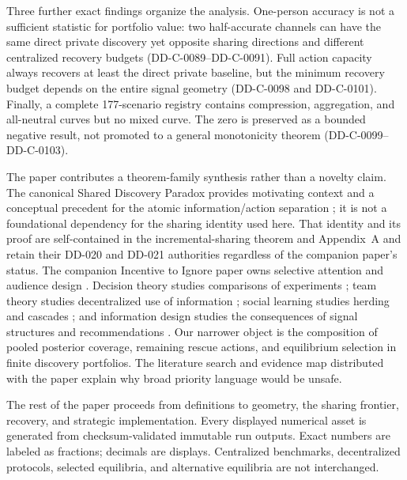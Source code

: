 \documentclass[12pt]{article}
\theoremstyle{definition}
\begin{document}


Three further exact findings organize the analysis. One-person accuracy is not a
sufficient statistic for portfolio value: two half-accurate channels can have the
same direct private discovery yet opposite sharing directions and different
centralized recovery budgets (DD-C-0089--DD-C-0091). Full action capacity always
recovers at least the direct private baseline, but the minimum recovery budget
depends on the entire signal geometry (DD-C-0098 and DD-C-0101). Finally, a
complete 177-scenario registry contains compression, aggregation, and all-neutral
curves but no mixed curve. The zero is preserved as a bounded negative result,
not promoted to a general monotonicity theorem (DD-C-0099--DD-C-0103).

The paper contributes a theorem-family synthesis rather than a novelty claim.
The canonical Shared Discovery Paradox provides motivating context and a
conceptual precedent for the atomic information/action separation
\citep{Nakajima2026SharedDiscovery}; it is not a foundational dependency for the
sharing identity used here. That identity and its proof are self-contained in
the incremental-sharing theorem and Appendix~A and retain their DD-020 and
DD-021 authorities regardless of the companion paper's status. The companion
Incentive to Ignore paper owns selective attention and audience design
\citep{Nakajima2026IncentiveToIgnore}.
Decision theory studies comparisons of experiments \citep{Blackwell1953}; team
theory studies decentralized use of information \citep{Radner1962}; social
learning studies herding and cascades \citep{Banerjee1992,BikhchandaniEtAl1992,
AcemogluEtAl2011}; and information design studies the consequences of signal
structures and recommendations \citep{KamenicaGentzkow2011,BergemannMorris2016}.
Our narrower object is the composition of pooled posterior coverage, remaining
rescue actions, and equilibrium selection in finite discovery portfolios. The
literature search and evidence map distributed with the paper explain why broad
priority language would be unsafe.

The rest of the paper proceeds from definitions to geometry, the sharing
frontier, recovery, and strategic implementation. Every displayed numerical
asset is generated from checksum-validated immutable run outputs. Exact numbers
are labeled as fractions; decimals are displays. Centralized benchmarks,
decentralized protocols, selected equilibria, and alternative equilibria are not
interchanged.
\end{document}
